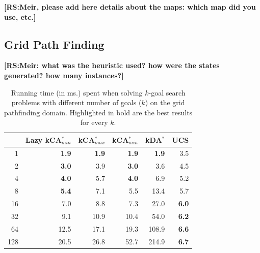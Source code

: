 \documentclass{aicom2e}
\newcommand{\kgs}{$k$-goal search}
\newcommand{\kastarmin}{kCA$^*_{min}$}
\newcommand{\kastarmax}{kCA$^*_{max}$}
\newcommand{\kxastar}{kDA$^*$}
\newcommand{\roni}[1]{\textbf{[RS:#1]}}
\begin{document}
\roni{Meir, please add here details about the maps: which map did you use, etc.}
\subsection{Grid Path Finding}
\roni{Meir: what was the heuristic used? how were the states generated? how many instances?}

\begin{table}[]
    \centering
    \begin{tabular}{|r|r|r|r|r|r|}
    \hline
        & \multicolumn{1}{c|}{Lazy \kastarmin{}} & \kastarmax &      \kastarmin       &  \kxastar & UCS       \\

        \hline
1     & \textbf{1.9}                 & \textbf{1.9} & \textbf{1.9} & \textbf{1.9} & 3.5          \\
2     & \textbf{3.0}                 & 3.9          & \textbf{3.0} & 3.6          & 4.5          \\
4     & \textbf{4.0}                 & 5.7          & \textbf{4.0} & 6.9          & 5.2          \\
8     & \textbf{5.4}                 & 7.1          & 5.5          & 13.4         & 5.7          \\
16    & 7.0                          & 8.8          & 7.3          & 27.0         & \textbf{6.0} \\
32    & 9.1                          & 10.9         & 10.4         & 54.0         & \textbf{6.2} \\
64    & 12.5                         & 17.1         & 19.3         & 108.9        & \textbf{6.6} \\
128   & 20.5                         & 26.8         & 52.7         & 214.9 &
\textbf{6.7}\\
\hline
    \end{tabular}
    \caption{Running time (in ms.) spent when solving \kgs{} problems with different number of goals ($k$) on the grid pathfinding domain. Highlighted in bold are the best results for every $k$.}
    \label{tab:pathfinding-runtime}
\end{table}
\end{document}
